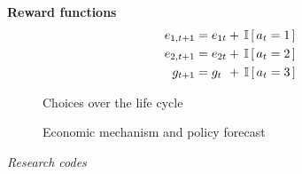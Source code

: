 \begin{frame}
  \textbf{Reward functions}\vspace{0.5cm}
\begin{align*}
    e_{1,t+1} &= e_{1t} + \,\mathbb{I}\,[\,a_t = 1\,] \\
    e_{2,t+1} &= e_{2t} + \,\mathbb{I}\,[\,a_t = 2\,] \\
    g_{t+1}   &= g_{t\phantom{2}}    +  \,\mathbb{I}\,[\,a_t = 3\,]
\end{align*}
\end{frame}
\begin{frame}
  \begin{figure}
  \caption{Choices over the life cycle}\label{Choices over the life cycle}
  \end{figure}
\end{frame}
\begin{frame}
  \begin{figure}[h!]\centering
  \caption{Economic mechanism and policy forecast}\label{Economic mechanism and policy forecast}
  \hspace{0.3cm}
  \end{figure}
\end{frame}
\begin{frame}\begin{center}
  \Large\textit{Research codes}
\end{center}\end{frame}
